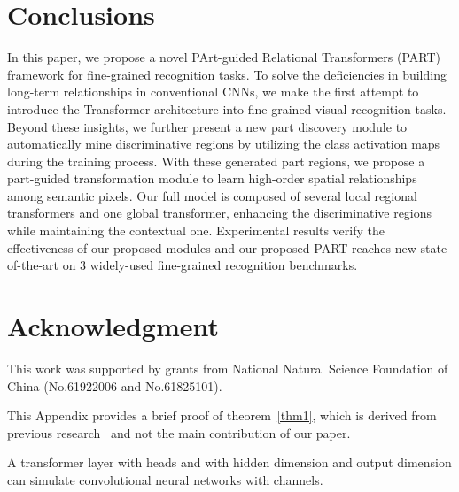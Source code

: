 \documentclass[journal]{IEEEtran}
\begin{document}
\section{Conclusions}\label{sec:conclusion}
In this paper, we propose a novel PArt-guided Relational Transformers (PART) framework for fine-grained recognition tasks. To solve the deficiencies in building long-term relationships in conventional CNNs, we make the first attempt to introduce the Transformer architecture into fine-grained visual recognition tasks. Beyond these insights, we further present a new part discovery module to automatically mine discriminative regions by utilizing the class activation maps during the training process. With these generated part regions, we propose a part-guided transformation module to learn high-order spatial relationships among semantic pixels. Our full model is composed of several local regional transformers and one global transformer, enhancing the discriminative regions while maintaining the contextual one. Experimental results verify the effectiveness of our proposed modules and our proposed PART reaches new state-of-the-art on 3 widely-used fine-grained recognition benchmarks.




















\section*{Acknowledgment}
This work was supported by grants from National Natural Science Foundation of China (No.61922006 and No.61825101).

\ifCLASSOPTIONcaptionsoff
  \newpage
\fi













 \label{sec:appendix}
This Appendix provides a brief proof of theorem~\ref{thm1}, which is derived from previous research~\cite{cordonnier2020relationship} and not the main contribution of our paper.

\begin{thm}
A transformer layer with  heads and with hidden dimension  and output dimension  can simulate convolutional neural networks with  channels.
\end{thm}
\end{document}
